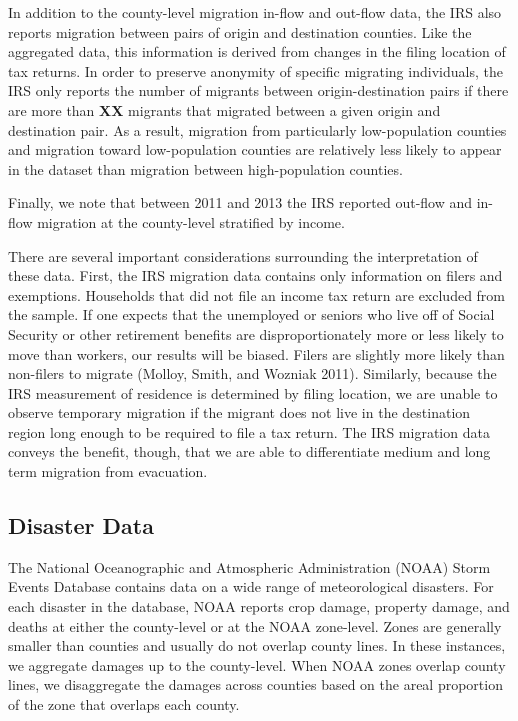 \documentclass[]{article}
\begin{document}
In addition to the county-level migration in-flow and out-flow data, the
IRS also reports migration between pairs of origin and destination
counties. Like the aggregated data, this information is derived from
changes in the filing location of tax returns. In order to preserve
anonymity of specific migrating individuals, the IRS only reports the
number of migrants between origin-destination pairs if there are more
than \textbf{XX} migrants that migrated between a given origin and
destination pair. As a result, migration from particularly
low-population counties and migration toward low-population counties are
relatively less likely to appear in the dataset than migration between
high-population counties.

Finally, we note that between 2011 and 2013 the IRS reported out-flow
and in-flow migration at the county-level stratified by income.

There are several important considerations surrounding the
interpretation of these data. First, the IRS migration data contains
only information on filers and exemptions. Households that did not file
an income tax return are excluded from the sample. If one expects that
the unemployed or seniors who live off of Social Security or other
retirement benefits are disproportionately more or less likely to move
than workers, our results will be biased. Filers are slightly more
likely than non-filers to migrate (Molloy, Smith, and Wozniak 2011).
Similarly, because the IRS measurement of residence is determined by
filing location, we are unable to observe temporary migration if the
migrant does not live in the destination region long enough to be
required to file a tax return. The IRS migration data conveys the
benefit, though, that we are able to differentiate medium and long term
migration from evacuation.

\subsection{Disaster Data}\label{disaster-data}

The National Oceanographic and Atmospheric Administration (NOAA) Storm
Events Database contains data on a wide range of meteorological
disasters. For each disaster in the database, NOAA reports crop damage,
property damage, and deaths at either the county-level or at the NOAA
zone-level. Zones are generally smaller than counties and usually do not
overlap county lines. In these instances, we aggregate damages up to the
county-level. When NOAA zones overlap county lines, we disaggregate the
damages across counties based on the areal proportion of the zone that
overlaps each county.
\end{document}
